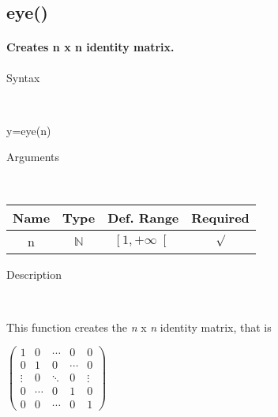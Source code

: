 \providecommand{\boldsymbol}[1]{\mbox{\boldmath $#1$}}

\providecommand{\tabularnewline}{\\}

 \newenvironment{lyxlist}[1]
   {\begin{list}{}
     {\settowidth{\labelwidth}{#1}
      \setlength{\leftmargin}{\labelwidth}
      \addtolength{\leftmargin}{\labelsep}
      \renewcommand{\makelabel}[1]{##1\hfil}}}
   {\end{list}}





\subsection*{\hypertarget{eye}{}{\Large eye()}}


\paragraph{\label{par:identity}Creates n x n identity matrix.}

\begin{description}
\item [Syntax]~
\end{description}
y=eye(n)

\begin{description}
\item [Arguments]~
\end{description}
\begin{tabular}{|c|c|c|c|}
\hline 
Name&
Type&
Def. Range&
Required\tabularnewline
\hline
\hline 
n&
$\mathbb{N}$&
$\left[1,+\infty\right[$&
$\surd$\tabularnewline
\hline
\end{tabular}

\begin{description}
\item [Description]~
\end{description}
This function creates the \textit{n} x \textit{n} identity matrix,
that is

\medskip{}
$\left(\begin{array}{ccccc}
1 & 0 & \cdots & 0 & 0\\
0 & 1 & 0 & \cdots & 0\\
\vdots & 0 & \ddots & 0 & \vdots\\
0 & \cdots & 0 & 1 & 0\\
0 & 0 & \cdots & 0 & 1\end{array}\right)$
\medskip{}

